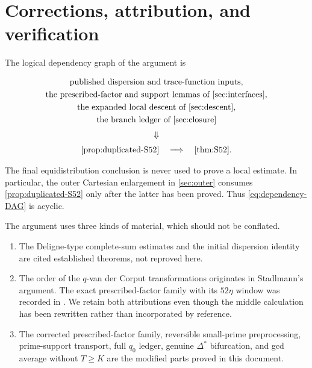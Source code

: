 \section{Corrections, attribution, and verification}
\label{sec:status}

The logical dependency graph of the argument is

\begin{equation}\label{eq:dependency-DAG}
 \begin{gathered}
 \text{published dispersion and trace-function inputs},\\
 \text{the prescribed-factor and support lemmas of \cref{sec:interfaces}},\\
 \text{the expanded local descent of \cref{sec:descent}},\\
 \text{the branch ledger of \cref{sec:closure}}\\[1mm]
 \Downarrow\\[1mm]
 \cref{prop:duplicated-S52}
 \quad\Longrightarrow\quad
 \cref{thm:S52}.
 \end{gathered}
\end{equation}

The final equidistribution conclusion is never used to prove a local
estimate.  In particular, the outer Cartesian enlargement in
\cref{sec:outer} consumes \cref{prop:duplicated-S52} only after the latter
has been proved.  Thus \cref{eq:dependency-DAG} is acyclic.

The argument uses three kinds of material, which should not be conflated.

\begin{enumerate}[label=\textup{(\arabic*)}]
\item The Deligne-type complete-sum estimates and the initial dispersion
identity are cited established theorems, not reproved here.

\item The order of the $q$-van der Corput transformations originates in
Stadlmann's argument.  The exact prescribed-factor family with its
$52\eta$ window was recorded in
\cite{Stadlmann2026}.  We retain both attributions even though the middle
calculation has been rewritten rather than incorporated by reference.

\item The corrected prescribed-factor family, reversible small-prime
preprocessing, prime-support transport, full $q_0$ ledger, genuine
$\Delta^*$ bifurcation, and gcd average without $T\ge K$ are the modified
parts proved in this document.
\end{enumerate}

